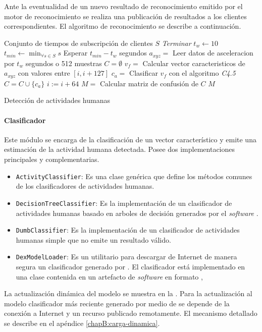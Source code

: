 Ante la eventualidad de un nuevo resultado de reconocimiento emitido
por el motor de reconocimiento se realiza una publicación de resultados
a los clientes correspondientes. El algoritmo de reconocimiento se
describe a continuación.

\begin{algorithm}[H]
\begin{algorithmic}[1]
    \Require Conjunto de tiempos de subscripción de clientes $S$
 			\State\textit{Terminar}
		\EndIf
		\State $t_w \leftarrow 10$
		\State $t_{min} \leftarrow \min_{\forall s \in S} s$
		\State Esperar $t_{min} - t_w$ segundos 
		\State $ a_{xyz} = $ Leer datos de asceleracion por $t_w$ segundos o 512 muestras
		\State $ C = \emptyset$
			\State $ v_f = $ Calcular vector caracteristicos de $a_{xyz}$ con valores entre $[i, i + 127]$
			\State $ c_a = $ Clasificar $v_f$ con el algoritmo \textit{C4.5}
			\State $ C = C \cup \{c_a\}$ 
			\State $i := i + 64$
        \EndFor
        \State $ M = $ Calcular matriz de confusión de $C$ 
		\State
		\Return $ M $
	\EndProcedure
\end{algorithmic}

\caption{\label{alg5:reconocimiento}Detección de actividades humanas}
\end{algorithm}


\paragraph{Clasificador}

Este módulo se encarga de la clasificación de un vector característico
y emite una estimación de la actividad humana detectada. Posee dos
implementaciones principales y complementarias.
\begin{itemize}
\item \texttt{\small{}ActivityClassifier}: Es una clase genérica que define
los métodos comunes de los clasificadores de actividades humanas.
\item \texttt{\small{}DecisionTreeClassifier}: Es la implementación de un
clasificador de actividades humanas basado en arboles de decisión
generados por el \emph{software} \texttt{} \cite{Frank2016}.
\item \texttt{\small{}DumbClassifier}: Es la implementación de un clasificador
de actividades humanas simple que no emite un resultado válido.
\item \texttt{\small{}DexModelLoader}: Es un utilitario para descargar de
Internet de manera segura un clasificador generado por .
El clasificador está implementado en una clase contenida en un artefacto
de \emph{software} en formato ,
\end{itemize}
La actualización dinámica del modelo se muestra en la .
Para la actualización al modelo clasificador más reciente generado
por medio de  se depende de la conexión a Internet y un
recurso publicado remotamente. El mecanismo detallado se describe
en el apéndice \ref{chapB:carga-dinamica}.

